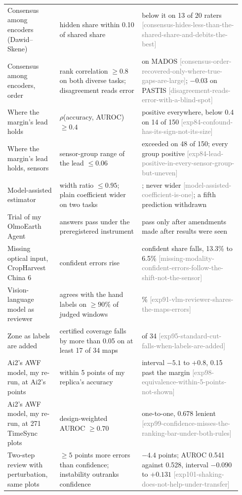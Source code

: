 \documentclass[11pt,a4paper]{article}
\newcommand{\claim}[1]{{\scriptsize\textsf{\textcolor{gray}{[#1]}}}}
\begin{document}
{\begin{longtable}{@{}>{\raggedright\arraybackslash}p{0.21\linewidth}>{\raggedright\arraybackslash}p{0.33\linewidth}>{\raggedright\arraybackslash}p{0.40\linewidth}@{}}
Consensus among encoders (Dawid--Skene) & hidden share within 0.10 of shared share & below it on 13 of 20 raters \claim{consensus-hides-less-than-the-shared-share-and-debits-the-best} \\
Consensus among encoders, order & rank correlation $\ge 0.8$ on both diverse tasks; disagreement reads error & 0.71 on MADOS \claim{consensus-order-recovered-only-where-true-gaps-are-large}; $-0.03$ on PASTIS \claim{disagreement-reads-error-with-a-blind-spot} \\
Where the margin's lead holds & $\rho$(accuracy, AUROC) $\ge 0.4$ & positive everywhere, below 0.4 on 14 of 150 \claim{exp84-confound-has-its-sign-not-its-size} \\
Where the margin's lead holds, sensors & sensor-group range of the lead $\le 0.06$ & exceeded on 48 of 150; every group positive \claim{exp84-lead-positive-in-every-sensor-group-but-uneven} \\
Model-assisted estimator & width ratio $\le 0.95$; plain coefficient wider on two tasks & 0.978; never wider \claim{model-assisted-coefficient-is-one}; a fifth prediction withdrawn \\
Trial of my OlmoEarth Agent & answers pass under the preregistered instrument & pass only after amendments made after results were seen \\
Missing optical input, CropHarvest China 6 & confident errors rise & confident share falls, 13.3\% to 6.5\% \claim{missing-modality-confident-errors-follow-the-shift-not-the-sensor} \\
Vision-language model as reviewer & agrees with the hand labels on $\ge 90\%$ of judged windows & 85.6\% \claim{exp91-vlm-reviewer-shares-the-maps-errors} \\
Zone as labels are added & certified coverage falls by more than 0.05 on at least 17 of 34 maps & 14 of 34 \claim{exp95-standard-cut-falls-when-labels-are-added} \\
Ai2's AWF model, my re-run, at Ai2's points & within 5 points of my replica's accuracy & interval $-5.1$ to $+0.8$, 0.15 past the margin \claim{exp98-equivalence-within-5-points-not-shown} \\
Ai2's AWF model, my re-run, at 271 TimeSync plots & design-weighted AUROC $\ge 0.70$ & 0.638 one-to-one, 0.678 lenient \claim{exp99-confidence-misses-the-ranking-bar-under-both-rules} \\
Two-step review with perturbation, same plots & $\ge 5$ points more errors than confidence; instability outranks confidence & $-4.4$ points; AUROC 0.541 against 0.528, interval $-0.090$ to $+0.131$ \claim{exp101-shaking-does-not-help-under-transfer} \\

\end{longtable}}
\end{document}
